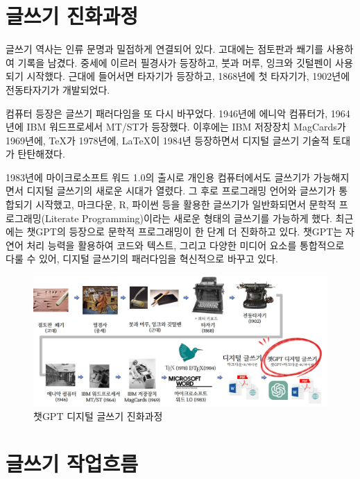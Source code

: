 \documentclass[
  letterpaper,
]{book}
\begin{document}
\hypertarget{uxae00uxc4f0uxae30-uxc9c4uxd654uxacfcuxc815}{%
\section{글쓰기
진화과정}\label{uxae00uxc4f0uxae30-uxc9c4uxd654uxacfcuxc815}}

글쓰기 역사는 인류 문명과 밀접하게 연결되어 있다. 고대에는 점토판과
쐐기를 사용하여 기록을 남겼다. 중세에 이르러 필경사가 등장하고, 붓과
머루, 잉크와 깃털펜이 사용되기 시작했다. 근대에 들어서면 타자기가
등장하고, 1868년에 첫 타자기가, 1902년에 전동타자기가 개발되었다.

컴퓨터 등장은 글쓰기 패러다임을 또 다시 바꾸었다. 1946년에 에니악
컴퓨터가, 1964년에 IBM 워드프로세서 MT/ST가 등장했다. 이후에는 IBM
저장장치 MagCards가 1969년에, TeX가 1978년에, LaTeX이 1984년 등장하면서
디지털 글쓰기 기술적 토대가 탄탄해졌다.

1983년에 마이크로소프트 워드 1.0의 출시로 개인용 컴퓨터에서도 글쓰기가
가능해지면서 디지털 글쓰기의 새로운 시대가 열렸다. 그 후로 프로그래밍
언어와 글쓰기가 통합되기 시작했고, 마크다운, R, 파이썬 등을 활용한
글쓰기가 일반화되면서 문학적 프로그래밍(Literate Programming)이라는
새로운 형태의 글쓰기를 가능하게 했다. 최근에는 챗GPT의 등장으로 문학적
프로그래밍이 한 단계 더 진화하고 있다. 챗GPT는 자연어 처리 능력을
활용하여 코드와 텍스트, 그리고 다양한 미디어 요소를 통합적으로 다룰 수
있어, 디지털 글쓰기의 패러다임을 혁신적으로 바꾸고 있다.

\begin{figure}

{\centering \includegraphics{images/writing_history.jpg}

}

\caption{챗GPT 디지털 글쓰기 진화과정}

\end{figure}

\hypertarget{uxae00uxc4f0uxae30-uxc791uxc5c5uxd750uxb984}{%
\section{글쓰기
작업흐름}\label{uxae00uxc4f0uxae30-uxc791uxc5c5uxd750uxb984}}
\end{document}
